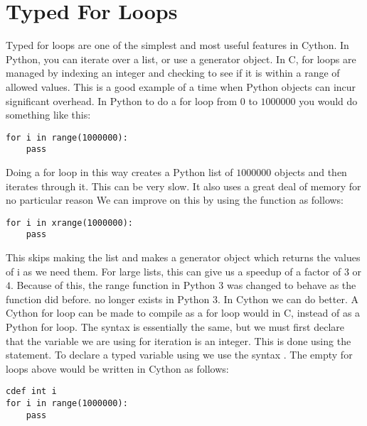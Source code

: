 \section*{Typed For Loops}

Typed for loops are one of the simplest and most useful features in Cython.
In Python, you can iterate over a list, or use a generator object.
In C, for loops are managed by indexing an integer and checking to see if it is within a range of allowed values.
This is a good example of a time when Python objects can incur significant overhead.
In Python to do a for loop from $0$ to $1000000$ you would do something like this:

\begin{lstlisting}
for i in range(1000000):
	pass
\end{lstlisting}

Doing a for loop in this way creates a Python list of $1000000$ objects and then iterates through it.
This can  be very slow.
It also uses a great deal of memory for no particular reason
We can improve on this by using the  function as follows:

\begin{lstlisting}
for i in xrange(1000000):
	pass
\end{lstlisting}

This skips making the list and makes a generator object which returns the values of i as we need them.
For large lists, this can give us a speedup of a factor of $3$ or $4$.
Because of this, the range function in Python 3 was changed to behave as the  function did before.
 no longer exists in Python 3.
In Cython we can do better.
A Cython for loop can be made to compile as a for loop would in C, instead of as a Python for loop.
The syntax is essentially the same, but we must first declare that the variable we are using for iteration is an integer.
This is done using the  statement.
To declare a typed variable using  we use the syntax .
The empty for loops above would be written in Cython as follows:

\begin{lstlisting}
cdef int i
for i in range(1000000):
	pass
\end{lstlisting}

